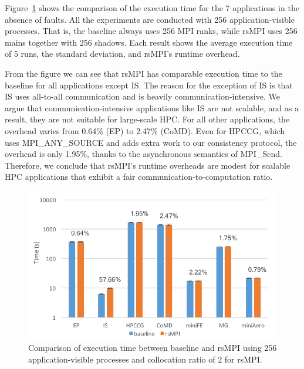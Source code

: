 Figure~\ref{fig:runtime_overhead} shows the comparison of the execution time for the 7 applications in the absence of faults. All the experiments are conducted with 256 application-visible processes. That is, the baseline always uses 256 MPI ranks, while rsMPI uses 256 mains together with 256 shadows. Each result shows the average execution time of 5 runs, the standard deviation, and rsMPI's runtime overhead. %

From the figure we can see that rsMPI has comparable execution time to the baseline for all applications except IS. The reason for the exception of IS is that IS uses all-to-all communication and is heavily communication-intensive. %
We argue that communication-intensive applications like IS are not scalable, and as a result, they are not suitable for large-scale HPC. 
For all other applications, the overhead varies from 0.64\% (EP) to 2.47\% (CoMD). Even for HPCCG, which uses MPI\_ANY\_SOURCE and adds extra work to our consistency protocol, the overhead is only 1.95\%, thanks to the asynchronous semantics of MPI\_Send. Therefore, we conclude that rsMPI's runtime overheads are modest for scalable HPC applications that exhibit a fair communication-to-computation ratio.

\begin{figure}[!t]
  \begin{center}
      \includegraphics[width=0.9\columnwidth]{figures/runtime_overhead}
  \end{center}
  \vskip -0.25in
  \caption{Comparison of execution time between baseline and rsMPI using 256 application-visible processes and collocation ratio of 2 for rsMPI.}
  \label{fig:runtime_overhead}
  \vspace{-0.15in}
\end{figure}

